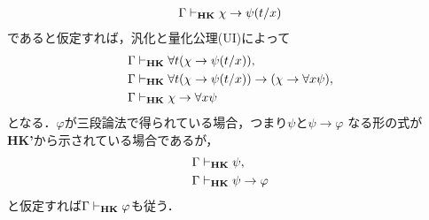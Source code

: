 \begin{metaprf}
\begin{description}
			\begin{align}
				\Gamma \vdash_{{\scriptsize \mbox{{\bf HK}}}} \chi \rightarrow \psi(t/x)
			\end{align}
			であると仮定すれば，汎化と量化公理(UI)によって
			\begin{align}
				\Gamma &\vdash_{{\scriptsize \mbox{{\bf HK}}}} \forall t(\chi \rightarrow \psi(t/x)), \\
				\Gamma &\vdash_{{\scriptsize \mbox{{\bf HK}}}} \forall t(\chi \rightarrow \psi(t/x))
					\rightarrow (\chi \rightarrow \forall x \psi), \\
				\Gamma &\vdash_{{\scriptsize \mbox{{\bf HK}}}} \chi \rightarrow \forall x \psi
			\end{align}
			となる．$\varphi$が三段論法で得られている場合，つまり$\psi$と$\psi \rightarrow \varphi$
			なる形の式が{\bf HK'}から示されている場合であるが，
			\begin{align}
				\Gamma &\vdash_{{\scriptsize \mbox{{\bf HK}}}} \psi, \\
				\Gamma &\vdash_{{\scriptsize \mbox{{\bf HK}}}} \psi \rightarrow \varphi
			\end{align}
			と仮定すれば$\Gamma \vdash_{{\scriptsize \mbox{{\bf HK}}}} \varphi$も従う．
	

\end{description}
\end{metaprf}

